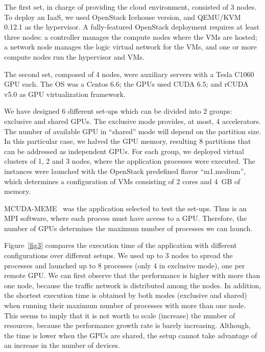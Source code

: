 \documentclass[a4paper,twoside]{article}
\begin{document}
The first set, in charge of providing the cloud environment, consisted of 3 nodes.
To deploy an IaaS, we used OpenStack Icehouse version, and QEMU/KVM 0.12.1 as the hypervisor.
A fully-featured OpenStack deployment requires at least three nodes: a controller manages the compute nodes 
where the VMs are hosted; a network node manages the logic virtual network for the VMs, and one or more compute nodes run the hypervisor and VMs.

The second set, composed of 4 nodes, were auxiliary servers with a Tesla C1060 GPU each. 
The OS was a Centos 6.6; the GPUs used CUDA 6.5; and rCUDA v5.0 as GPU virtualization framework.

We have designed 6 different set-ups which can be divided into 2 groups: exclusive and shared GPUs. 
The exclusive mode provides, at most, 4 accelerators. 
The number of available GPU in “shared” mode will depend on the partition size. 
In this particular case, we halved the GPU memory, resulting 8 partitions that can be addressed as independent GPUs.
For each group, we deployed virtual clusters of 1, 2 and 3 nodes, where the application processes were executed. 
The instances were launched with the OpenStack predefined flavor “m1.medium”, which determines a configuration of VMs consisting of 2 cores and 4~GB of memory.

MCUDA-MEME~\cite{Liu2010} was the application selected to test the set-ups. 
Thus is an MPI software, where each process must have access to a GPU.
Therefore, the number of GPUs determines the maximum number of processes we can launch.

Figure~\ref{fig3} compares the execution time of the application with different configurations over different setups. 
We used up to 3 nodes to spread the processes and launched up to 8 processes (only 4 in exclusive mode), one per remote GPU.
We can first observe that the performance is higher with more than one node, because the traffic network is distributed among the nodes.
In addition, the shortest execution time is obtained by both modes (exclusive and shared) when running their maximum number of processes with more than one node.
This seems to imply that it is not worth to scale (increase) the number of resources, because the performance growth rate is barely increasing.
Although, the time is lower when the GPUs are shared, the setup cannot take advantage of an increase in the number of devices.
\end{document}
